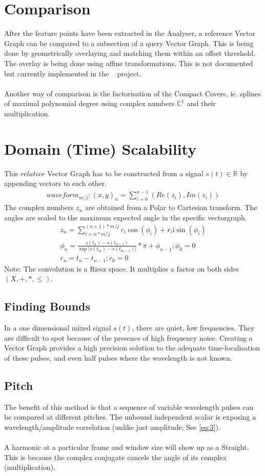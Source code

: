 \documentclass{report}
\begin{document}
\section*{Comparison}
After the feature points have been extracted in the Analyser, a reference Vector Graph can be compared to a subsection of a query Vector Graph. This is being done by geometrically overlaying and matching them within an offset threshold. The overlay is being done using affine transformations. This is not documented but currently implemented in the ~\cite[Stopeight\_Comparator.tex]{Analyzer} project.\\\\
Another way of comparison is the factorisation of the Compact Covers, ie. splines of maximal polynomial degree using complex numbers $\mathbb{C}^1$ and their multiplication.
\section{Domain (Time) Scalability}
This $relative$ Vector Graph has to be constructed from a signal $s(t)\in \mathbb{R}$ by appending vectors to each other.
\begin{align}
waveform_{m/j}: (x,y)_{n}=\sum \limits _{i=0}^{n-1}(Re(z_{i}),Im(z_{i}))
\end{align}
The complex numbers $z_{n}$ are obtained from a Polar to Cartesian transform. The angles are scaled to the maximum expected angle in the specific vectorgraph.
\begin{align}
z_{n}=\sum \limits _{i=n*m/j}^{(n+1)*m/j}r_{i}\cos(\phi_{i})+r_{i}\mathrm{i}\sin(\phi_{i})\\
\phi_{n}=\frac{s(t_{n})-s(t_{n-1})}{\sup \lvert s(t_{m})-s(t_{m-1}) \rvert}*\pi+\phi_{n-1};\phi_{0}=0\\
r_{n}=t_{n}-t_{n-1};r_{0}=0
\end{align}
Note: The convolution is a Riesz space. It multiplies a factor on both sides $(X,+,*,\leq)$.
\subsection{Finding Bounds}
In a one dimensional mixed signal $s(t)$, there are quiet, low frequencies. They are difficult to spot because of the presence of high frequency noise. Creating a Vector Graph provides a high precision solution to the adequate time-localisation of these pulses, and even half pulses where the wavelength is not known.
\subsection{Pitch}
The benefit of this method is that a sequence of variable wavelength pulses can be compared at different pitches. The unbound independent scalar is exposing a wavelength/amplitude correlation (unlike just amplitude; See \eqref{eq:3}).\\\\
A harmonic at a particular frame and window size will show up as a Straight. This is because the complex conjugate cancels the angle of its complex (multiplication).
\end{document}
